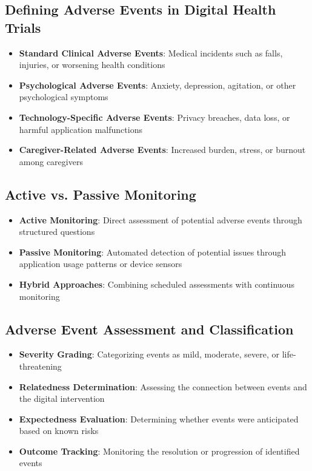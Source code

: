 \subsection{Defining Adverse Events in Digital Health Trials}
\begin{itemize}
    \item \textbf{Standard Clinical Adverse Events}: Medical incidents such as falls, injuries, or worsening health conditions
    
    \item \textbf{Psychological Adverse Events}: Anxiety, depression, agitation, or other psychological symptoms
    
    \item \textbf{Technology-Specific Adverse Events}: Privacy breaches, data loss, or harmful application malfunctions
    
    \item \textbf{Caregiver-Related Adverse Events}: Increased burden, stress, or burnout among caregivers
\end{itemize}

\subsection{Active vs. Passive Monitoring}
\begin{itemize}
    \item \textbf{Active Monitoring}: Direct assessment of potential adverse events through structured questions
    
    \item \textbf{Passive Monitoring}: Automated detection of potential issues through application usage patterns or device sensors
    
    \item \textbf{Hybrid Approaches}: Combining scheduled assessments with continuous monitoring
\end{itemize}

\subsection{Adverse Event Assessment and Classification}
\begin{itemize}
    \item \textbf{Severity Grading}: Categorizing events as mild, moderate, severe, or life-threatening
    
    \item \textbf{Relatedness Determination}: Assessing the connection between events and the digital intervention
    
    \item \textbf{Expectedness Evaluation}: Determining whether events were anticipated based on known risks
    
    \item \textbf{Outcome Tracking}: Monitoring the resolution or progression of identified events
\end{itemize}

